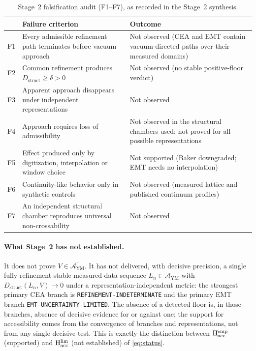 \documentclass[11pt,a4paper]{article}
\theoremstyle{definition}
\theoremstyle{remark}
\newcommand{\Dstruct}{D_{\mathrm{struct}}}
\newcommand{\AYM}{\mathcal{A}_{\mathrm{YM}}}
\newcommand{\Hacc}{\mathrm{H}_{\mathrm{acc}}}
\begin{document}
\begin{table}[t]
\centering\small
\caption{Stage~2 falsification audit (F1--F7), as recorded in the Stage~2 synthesis.}\label{tab:F}
\begin{tabularx}{\textwidth}{@{}l>{\raggedright\arraybackslash}X>{\raggedright\arraybackslash}p{4.4cm}@{}}
\toprule
& Failure criterion & Outcome\\\midrule
F1 & Every admissible refinement path terminates before vacuum approach & Not observed (CEA and EMT contain vacuum-directed paths over their measured domains)\\
F2 & Common refinement produces $\Dstruct\ge\delta>0$ & Not observed (no stable positive-floor verdict)\\
F3 & Apparent approach disappears under independent representations & Not observed\\
F4 & Approach requires loss of admissibility & Not observed in the structural chambers used; not proved for all possible representations\\
F5 & Effect produced only by digitization, interpolation or window choice & Not supported (Baker downgraded; EMT needs no interpolation)\\
F6 & Continuity-like behavior only in synthetic controls & Not observed (measured lattice and published continuum profiles)\\
F7 & An independent structural chamber reproduces universal non-crossability & Not observed\\\bottomrule
\end{tabularx}
\end{table}

\paragraph{What Stage~2 has not established.} It does not prove $V\in\overline{\AYM}$. It has not delivered, with decisive precision, a single fully refinement-stable measured-data sequence $L_n\in\AYM$ with $\Dstruct(L_n,V)\to0$ under a representation-independent metric: the strongest primary CEA branch is \texttt{REFINEMENT-\allowbreak{}INDETERMINATE} and the primary EMT branch \texttt{EMT-\allowbreak{}UNCERTAINTY-\allowbreak{}LIMITED}. The absence of a detected floor is, in those branches, absence of decisive evidence for or against one; the support for accessibility comes from the convergence of branches and representations, not from any single decisive test. This is exactly the distinction between $\Hacc^{\rm emp}$ (supported) and $\Hacc^{\rm lim}$ (not established) of \cref{eq:status}.
\end{document}
